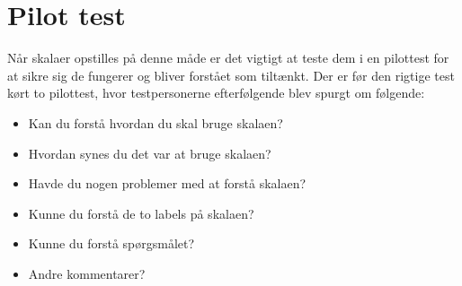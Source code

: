 \section*{Pilot test}
\label{pilottest}
%
Når skalaer opstilles på denne måde er det vigtigt at teste dem i en pilottest for at sikre sig de fungerer og bliver forstået som tiltænkt. Der er før den rigtige test kørt to pilottest, hvor testpersonerne efterfølgende blev spurgt om følgende:\blankline
%
\begin{itemize}
	\item Kan du forstå hvordan du skal bruge skalaen?
	\item Hvordan synes du det var at bruge skalaen?
	\item Havde du nogen problemer med at forstå skalaen?
	\item Kunne du forstå de to labels på skalaen?
	\item Kunne du forstå spørgsmålet?
	\item Andre kommentarer?
\end{itemize} 
